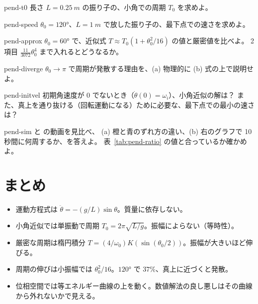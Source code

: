 \begin{exercise}[基礎]{pend-t0}
長さ $L=\qty{0.25}{m}$ の振り子の、小角での周期 $T_0$ を求めよ。
\end{exercise}

\begin{exercise}[基礎]{pend-speed}
$\theta_0=\ang{120}$、$L=\qty{1}{m}$ で放した振り子の、最下点での速さを求めよ。
\end{exercise}

\begin{exercise}[応用]{pend-approx}
$\theta_0=\ang{60}$ で、近似式 $T\approx T_0(1+\theta_0^2/16)$ の値と厳密値を比べよ。
2 項目 $\tfrac{11}{3072}\theta_0^4$ まで入れるとどうなるか。
\end{exercise}

\begin{exercise}[応用]{pend-diverge}
$\theta_0\to\pi$ で周期が発散する理由を、(a) 物理的に (b) 式の上で説明せよ。
\end{exercise}

\begin{exercise}[応用]{pend-initvel}
初期角速度が 0 でないとき（$\dot\theta(0)=\omega_i$）、小角近似の解は？
また、真上を通り抜ける（回転運動になる）ために必要な、最下点での最小の速さは？
\end{exercise}

\begin{exercise}[シミュレーション]{pend-sim}
 と  の動画を見比べ、
(a) 橙と青のずれ方の違い、(b) 右のグラフで 10 秒間に何周するか、を答えよ。
表~\ref{tab:pend-ratio} の値と合っているか確かめよ。
\end{exercise}

\section{まとめ}\label{sec:pend-summary}

\begin{summary}
\begin{itemize}
  \item 運動方程式は $\ddot\theta=-(g/L)\sin\theta$。質量に依存しない。
  \item 小角近似では単振動で周期 $T_0=2\pi\sqrt{L/g}$。振幅によらない（等時性）。
  \item 厳密な周期は楕円積分 $T=(4/\omega_0)K(\sin(\theta_0/2))$。振幅が大きいほど伸びる。
  \item 周期の伸びは小振幅では $\theta_0^2/16$。$\ang{120}$ で $37\%$、真上に近づくと発散。
  \item 位相空間では等エネルギー曲線の上を動く。数値解法の良し悪しはその曲線から外れないかで見える。
\end{itemize}
\end{summary}


